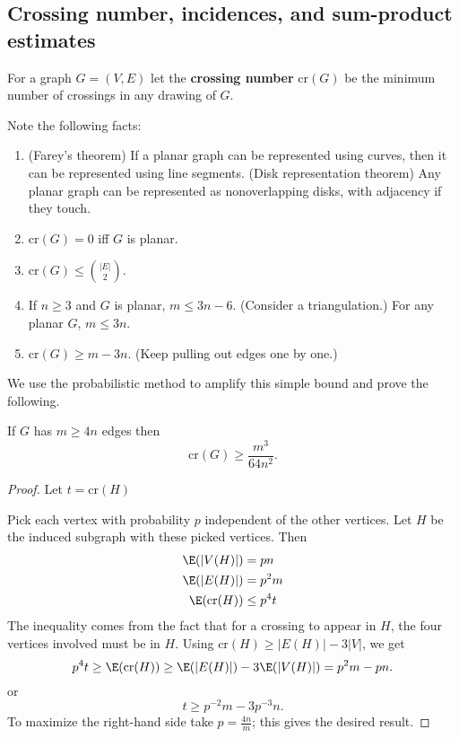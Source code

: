 
\subsection{Crossing number, incidences, and sum-product estimates}
\begin{df}
For a graph $G=(V,E)$ let the \textbf{crossing number} 
$\text{cr}(G)$ be the minimum number of crossings in any drawing of $G$.
\end{df}
Note the following facts:
\begin{enumerate}
\item (Farey's theorem) If a planar graph can be represented using curves, then it can be represented using line segments. (Disk representation theorem) Any planar graph can be represented as nonoverlapping disks, with adjacency if they touch.
\item
$\text{cr}(G)=0$ iff $G$ is planar.
\item
$\text{cr}(G)\le \binom{|E|}{2}$.
\item 
If $n\ge 3$ and $G$ is planar, $m\le 3n-6$. (Consider a triangulation.) For any planar $G$, $m\le 3n$.
\item $\text{cr}(G)\ge m-3n$. (Keep pulling out edges one by one.)
\end{enumerate}
We use the probabilistic method to amplify this simple bound and prove the following.
\begin{thm}%
If $G$ has $m\ge 4n$ edges then
\[
\text{cr}(G)\ge \frac{m^3}{64n^2}.
\]
\end{thm}
\begin{proof}
Let $t=\text{cr}(H)$

Pick each vertex with probability $p$ independent of the other vertices. Let $H$ be the induced subgraph with these picked vertices. Then
\begin{align*}
\E(|V(H)|)&=pn\\
\E(|E(H)|)&=p^2m\\
\E(\text{cr}(H))&\le p^4t
\end{align*}
The inequality comes from the fact that for a crossing to appear in $H$, the four vertices involved must be in $H$.
Using $\text{cr}(H)\ge |E(H)|-3|V|$, we get
\[
p^4t\ge \E(\text{cr}(H))\ge \E(|E(H)|)-3\E(|V(H)|)=p^2m-pn.
\]
or
\[
t\ge p^{-2}m-3p^{-3}n.
\]
To maximize the right-hand side take $p=\frac{4n}{m}$; this gives the desired result.
\end{proof}
